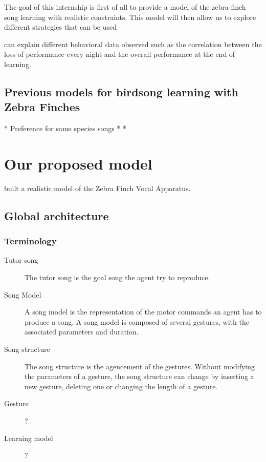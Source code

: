 \documentclass{report}
\begin{document}
The goal of this internship is first of all to provide a model of the zebra
finch song learning with realistic constraints. This model will then allow us
to explore different strategies that can be used

can explain different behavioral
data observed such as the correlation between the loss of performance every
night and the overall performance at the end of learning.

\section{Previous models for birdsong learning with Zebra Finches}

* Preference for same species songs \cite{margoliash_evaluating_2002,
marler_three_1997}
* \cite{marler_three_1997}
* \cite{coen_learning_2007}


\chapter{Our proposed model}

\textcite{perl_reconstruction_2011} built a realistic model of the Zebra Finch
Vocal Apparatus.

\section{Global architecture}

\subsection{Terminology}

\begin{description}
  \item[Tutor song] The tutor song is the goal song the agent try to reproduce.
  \item[Song Model] A song model is the representation of the motor commands an
  agent has to produce a song. A song model is composed of several gestures,
  with the associated parameters and duration.
  \item[Song structure] The song structure is the agencement of the gestures.
  Without modifying the parameters of a gesture, the song structure can change
  by inserting a new gesture, deleting one or changing the length of a gesture.
  \item[Gesture] ?
  \item[Learning model] ?
\end{description}
\end{document}
